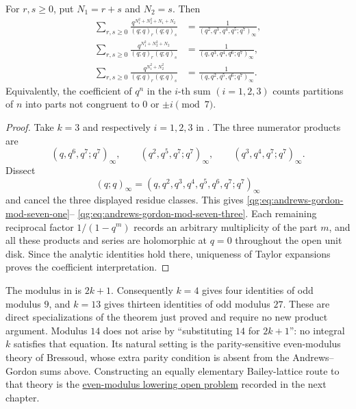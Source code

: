 \begin{corollary}
\label{qg:cor-andrews-gordon-mod7}
For \(r,s\ge0\), put \(N_1=r+s\) and \(N_2=s\).  Then
\begin{align}
 \sum_{r,s\ge0}
 \frac{q^{N_1^2+N_2^2+N_1+N_2}}
      {(q;q)_r(q;q)_s}
 &=
 \frac1{(q^2,q^3,q^4,q^5;q^7)_\infty},
 \label{qg:eq:andrews-gordon-mod-seven-one}\\
 \sum_{r,s\ge0}
 \frac{q^{N_1^2+N_2^2+N_2}}
      {(q;q)_r(q;q)_s}
 &=
 \frac1{(q,q^3,q^4,q^6;q^7)_\infty},
 \label{qg:eq:andrews-gordon-mod-seven-two}\\
 \sum_{r,s\ge0}
 \frac{q^{N_1^2+N_2^2}}
      {(q;q)_r(q;q)_s}
 &=
 \frac1{(q,q^2,q^5,q^6;q^7)_\infty}.
 \label{qg:eq:andrews-gordon-mod-seven-three}
\end{align}
Equivalently, the coefficient of \(q^n\) in the \(i\)-th sum
\((i=1,2,3)\) counts partitions of \(n\) into parts not congruent to
\(0\) or \(\pm i\pmod7\).
\end{corollary}

\begin{proof}
Take \(k=3\) and respectively \(i=1,2,3\) in
.  The three numerator products are
\[
 (q,q^6,q^7;q^7)_\infty,\qquad
 (q^2,q^5,q^7;q^7)_\infty,\qquad
 (q^3,q^4,q^7;q^7)_\infty.
\]
Dissect
\[
 (q;q)_\infty=(q,q^2,q^3,q^4,q^5,q^6,q^7;q^7)_\infty
\]
and cancel the three displayed residue classes.  This gives
\eqref{qg:eq:andrews-gordon-mod-seven-one}--
\eqref{qg:eq:andrews-gordon-mod-seven-three}.  Each remaining reciprocal
factor \(1/(1-q^m)\) records an arbitrary multiplicity of the part \(m\),
and all these products and series are holomorphic at \(q=0\) throughout
the open unit disk.  Since the analytic identities hold there, uniqueness
of Taylor expansions proves the coefficient interpretation.
\end{proof}

\begin{remark}
The modulus in  is \(2k+1\).  Consequently
\(k=4\) gives four identities of odd modulus \(9\), and \(k=13\) gives
thirteen identities of odd modulus \(27\).  These are direct specializations
of the theorem just proved and require no new product argument.  Modulus \(14\)
does not arise by ``substituting \(14\) for \(2k+1\)'': no integral \(k\)
satisfies that equation.  Its natural setting is the parity-sensitive
even-modulus theory of Bressoud, whose extra parity condition is absent from
the Andrews--Gordon sums above.  Constructing an equally elementary
Bailey-lattice route to that theory is the
\hyperref[qg:prob-even-modulus-lowering]{even-modulus lowering open problem}
recorded in the next chapter.
\end{remark}

